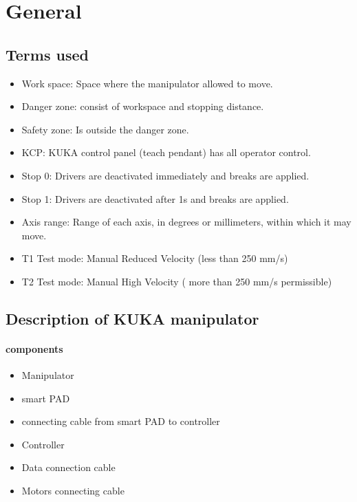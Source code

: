

\section{General}
\subsection{Terms used}
\begin{itemize}
	\item Work space: Space where the manipulator allowed to move.
	\item Danger zone: consist of workspace and stopping distance.
	\item Safety zone: Is outside the danger zone.
	\item KCP: KUKA control panel (teach pendant) has all operator control.
	\item Stop 0: Drivers are deactivated immediately and breaks are applied.
	\item Stop 1: Drivers are deactivated after 1s and breaks are applied.
	\item Axis range: Range of each axis, in degrees or millimeters, within which it may move.
	\item T1 Test mode: Manual Reduced Velocity (less than 250 mm/s)
	\item  T2 Test mode: Manual High Velocity ( more than 250 mm/s permissible)
\end{itemize}
	
\subsection{Description of KUKA manipulator}
\paragraph{components}
\begin{itemize}
	\item Manipulator
	\item smart PAD	
	\item connecting cable from smart PAD to controller
	\item Controller
	\item Data connection cable
	\item Motors connecting cable	
\end{itemize}

